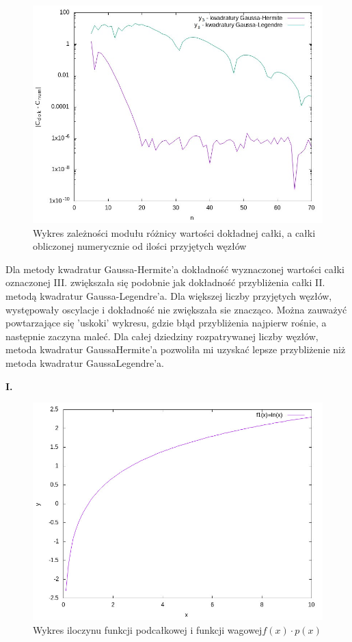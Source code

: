 \documentclass{article}
\begin{document}
\begin{figure}[H]
\begin{center}
\includegraphics[height=0.5\linewidth]{zad3.jpg}
\caption{Wykres zależności modułu różnicy wartości dokładnej całki, a całki obliczonej numerycznie od ilości przyjętych
węzłów}
\label{pierwszy} 
\end{center}
\end{figure}

Dla metody kwadratur Gaussa-Hermite’a dokładność wyznaczonej wartości całki
oznaczonej III. zwiększała się podobnie jak dokładność przybliżenia całki II. metodą
kwadratur Gaussa-Legendre’a. Dla większej liczby przyjętych węzłów,
występowały oscylacje i dokładność nie zwiększała sie znacząco. Można zauważyć powtarzające się
'uskoki' wykresu, gdzie błąd przybliżenia najpierw rośnie, a następnie zaczyna maleć.
Dla całej dziedziny rozpatrywanej liczby węzłów, metoda kwadratur GaussaHermite’a pozwoliła mi uzyskać lepsze przybliżenie niż metoda kwadratur GaussaLegendre’a.

\textbf{I.}

\begin{figure}[H]
\begin{center}
\includegraphics[height=0.5\linewidth]{f1.jpg}
\caption{Wykres iloczynu funkcji podcałkowej i funkcji wagowej$f(x)\cdot p(x)$}
\label{pierwszy} 
\end{center}
\end{figure}
\end{document}
